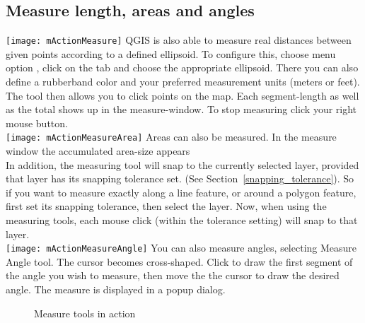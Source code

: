 \subsection{Measure length, areas and angles}

\texttt{[image: mActionMeasure]}
QGIS is also able to measure real distances between given
points according to a defined ellipsoid. To configure this, choose menu option
 \arrow {},
click on the  tab and choose the appropriate ellipsoid. There
you can also define a rubberband color and your preferred measurement units
(meters or feet). The tool then allows you to click points on the map. Each
segment-length as well as the total shows up in the measure-window. To stop measuring click your right mouse button. \\
\texttt{[image: mActionMeasureArea]} Areas can also be measured.
In the measure window the accumulated area-size appears  \\
In addition, the measuring tool will snap to the currently selected layer, provided that layer has its snapping tolerance set. (See Section~\ref{snapping_tolerance}). So if you want to measure exactly along a line feature, or around a polygon feature, first set its snapping tolerance, then select the layer. Now, when using the measuring tools, each mouse click (within the tolerance setting) will snap to that layer. \\
\texttt{[image: mActionMeasureAngle]}
You can also measure angles, selecting Measure Angle tool. The cursor becomes
cross-shaped. Click to draw the first segment of the angle you wish to
measure, then move the the cursor to draw the desired angle. The measure
is displayed in a popup dialog.

\begin{figure}[ht]
\centering
     \hspace{0.33cm}
     \hspace{0.33cm}
   \caption{Measure tools in action \nixcaption} \label{fig:measure}
\end{figure}

